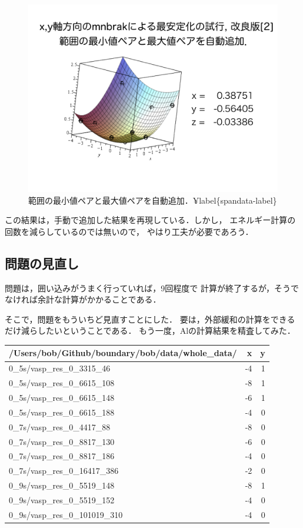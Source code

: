 \documentclass[11pt,dvipdfmx]{jsarticle}
\begin{document}
\begin{figure}[H][htbp]
\centering
\begin{center}
\includegraphics[width=150mm]{../.././figs/thesis/thesis_010.jpeg}
\end{center}
\caption{範囲の最小値ペアと最大値ペアを自動追加．¥label\{spandata-label\}}

\label{fig:}
\end{figure}

この結果は，手動で追加した結果を再現している．しかし，
エネルギー計算の回数を減らしているのでは無いので，
やはり工夫が必要であろう．

    \subsection{問題の見直し}\label{ux554fux984cux306eux898bux76f4ux3057}

問題は，囲い込みがうまく行っていれば，9回程度で
計算が終了するが，そうでなければ余計な計算がかかることである．

そこで，問題をもういちど見直すことにした．
要は，外部緩和の計算をできるだけ減らしたいということである．
もう一度，Alの計算結果を精査してみた．

\begin{longtable}[]{@{}lrr@{}}
\toprule
/Users/bob/Github/boundary/bob/data/whole\_data/ & x & y\tabularnewline
\midrule
\endhead
0\_5s/vasp\_res\_0\_3315\_46 & -4 & 1\tabularnewline
0\_5s/vasp\_res\_0\_6615\_108 & -8 & 1\tabularnewline
0\_5s/vasp\_res\_0\_6615\_148 & -6 & 1\tabularnewline
0\_5s/vasp\_res\_0\_6615\_188 & -4 & 0\tabularnewline
0\_7s/vasp\_res\_0\_4417\_88 & -8 & 0\tabularnewline
0\_7s/vasp\_res\_0\_8817\_130 & -6 & 0\tabularnewline
0\_7s/vasp\_res\_0\_8817\_186 & -4 & 0\tabularnewline
0\_7s/vasp\_res\_0\_16417\_386 & -2 & 0\tabularnewline
0\_9s/vasp\_res\_0\_5519\_148 & -8 & 1\tabularnewline
0\_9s/vasp\_res\_0\_5519\_152 & -4 & 0\tabularnewline
0\_9s/vasp\_res\_0\_101019\_310 & -4 & 0\tabularnewline
\bottomrule
\end{longtable}
\end{document}
